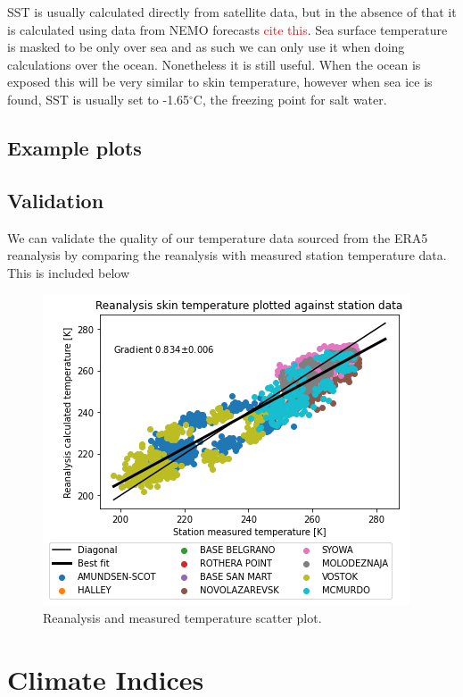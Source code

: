 \documentclass[../main.tex]{subfiles}
\begin{document}
SST is usually calculated directly from satellite data, but in the absence of that it is calculated using data from NEMO forecasts 
\textcolor{red}{cite this}.
Sea surface temperature is masked to be only over sea and as such we can only use it when doing calculations over the ocean. Nonetheless it is still useful.
When the ocean is exposed this will be very similar to skin temperature, however when sea ice is found, SST is usually set to -1.65$^\circ$C, the freezing point for salt water. 

\subsection{Example plots}


\subsection{Validation}
We can validate the quality of our temperature data sourced from the ERA5 reanalysis by comparing the reanalysis with measured station temperature data. This is included below
\begin{figure}[ht!]
    \centering
    \includegraphics[width=\textwidth]{images/week7/lres/temperature_station_verification_scatter}
    \caption{Reanalysis and measured temperature scatter plot.}
    \label{fig:temperature_station_verification_scatter}
\end{figure}



\section{Climate Indices}
\end{document}
